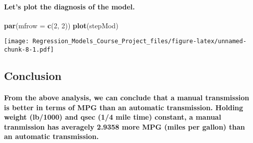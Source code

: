 \documentclass[]{article}
\newenvironment{Shaded}{\begin{snugshade}}{\end{snugshade}}
\newcommand{\DataTypeTok}[1]{\textcolor[rgb]{0.13,0.29,0.53}{#1}}
\newcommand{\DecValTok}[1]{\textcolor[rgb]{0.00,0.00,0.81}{#1}}
\newcommand{\KeywordTok}[1]{\textcolor[rgb]{0.13,0.29,0.53}{\textbf{#1}}}
\newcommand{\NormalTok}[1]{#1}
\let\oldparagraph\paragraph
\renewcommand{\paragraph}[1]{\oldparagraph{#1}\mbox{}}
\begin{document}
\hypertarget{lets-plot-the-diagnosis-of-the-model.}{%
\paragraph{Let's plot the diagnosis of the
model.}\label{lets-plot-the-diagnosis-of-the-model.}}

\begin{Shaded}
\begin{Highlighting}[]
\KeywordTok{par}\NormalTok{(}\DataTypeTok{mfrow =} \KeywordTok{c}\NormalTok{(}\DecValTok{2}\NormalTok{, }\DecValTok{2}\NormalTok{))}
\KeywordTok{plot}\NormalTok{(stepMod)}
\end{Highlighting}
\end{Shaded}

\texttt{[image: Regression\_Models\_Course\_Project\_files/figure-latex/unnamed-chunk-8-1.pdf]}

\hypertarget{conclusion}{%
\subsection{Conclusion}\label{conclusion}}

\hypertarget{from-the-above-analysis-we-can-conclude-that-a-manual-transmission-is-better-in-terms-of-mpg-than-an-automatic-transmission.-holding-weight-lb1000-and-qsec-14-mile-time-constant-a-manual-tranmission-has-averagely-2.9358-more-mpg-miles-per-gallon-than-an-automatic-transmission.}{%
\paragraph{From the above analysis, we can conclude that a manual
transmission is better in terms of MPG than an automatic transmission.
Holding weight (lb/1000) and qsec (1/4 mile time) constant, a manual
tranmission has averagely 2.9358 more MPG (miles per gallon) than an
automatic
transmission.}\label{from-the-above-analysis-we-can-conclude-that-a-manual-transmission-is-better-in-terms-of-mpg-than-an-automatic-transmission.-holding-weight-lb1000-and-qsec-14-mile-time-constant-a-manual-tranmission-has-averagely-2.9358-more-mpg-miles-per-gallon-than-an-automatic-transmission.}}
\end{document}
